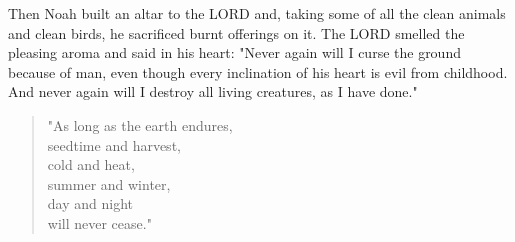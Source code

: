 \V Then Noah built an altar to the LORD and, taking some of all the clean
animals and clean birds, he sacrificed burnt offerings on it. \V The LORD
smelled the pleasing aroma and said in his heart: "Never again will I curse the
ground because of man, even though every inclination of his heart is evil from
childhood. And never again will I destroy all living creatures, as I have done."

\begin{quotation}
\V "As long as the earth endures,\\
seedtime and harvest,\\
cold and heat,\\
summer and winter,\\
day and night\\
will never cease."
\end{quotation}
